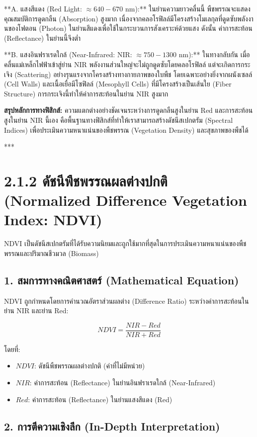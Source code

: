 \documentclass[11pt,a4paper,openany]{report}
\begin{document}
**A. แสงสีแดง (Red Light: $\approx 640 - 670 \text{ nm}$):**
ในย่านความยาวคลื่นนี้ พืชพรรณจะแสดงคุณสมบัติการดูดกลืน (Absorption) สูงมาก เนื่องจากคลอโรฟิลล์มีโครงสร้างโมเลกุลที่ดูดซับพลังงานของโฟตอน (Photon) ในย่านสีแดงเพื่อใช้ในกระบวนการสังเคราะห์ด้วยแสง ดังนั้น ค่าการสะท้อน (Reflectance) ในย่านนี้จึงต่ำ

**B. แสงอินฟราเรดใกล้ (Near-Infrared: NIR: $\approx 750 - 1300 \text{ nm}$):**
ในทางกลับกัน เมื่อคลื่นแม่เหล็กไฟฟ้าเข้าสู่ย่าน NIR พลังงานส่วนใหญ่จะไม่ถูกดูดซับโดยคลอโรฟิลล์ แต่จะเกิดการกระเจิง (Scattering) อย่างรุนแรงจากโครงสร้างทางกายภาพของใบพืช โดยเฉพาะอย่างยิ่งจากผนังเซลล์ (Cell Walls) และเนื้อเยื่อมีโซฟิลล์ (Mesophyll Cells) ที่มีโครงสร้างเป็นเส้นใย (Fiber Structure) การกระเจิงนี้ทำให้ค่าการสะท้อนในย่าน NIR สูงมาก

\textbf{สรุปหลักการทางฟิสิกส์:}
ความแตกต่างอย่างชัดเจนระหว่างการดูดกลืนสูงในย่าน Red และการสะท้อนสูงในย่าน NIR นี้เอง คือพื้นฐานทางฟิสิกส์ที่ทำให้เราสามารถสร้างดัชนีสเปกตรัม (Spectral Indices) เพื่อประเมินความหนาแน่นของพืชพรรณ (Vegetation Density) และสุขภาพของพืชได้

***

\section{2.1.2 ดัชนีพืชพรรณผลต่างปกติ (Normalized Difference Vegetation Index: NDVI)}


NDVI เป็นดัชนีสเปกตรัมที่ได้รับความนิยมและถูกใช้มากที่สุดในการประเมินความหนาแน่นของพืชพรรณและปริมาณชีวมวล (Biomass)

\subsection{1. สมการทางคณิตศาสตร์ (Mathematical Equation)}


NDVI ถูกกำหนดโดยการคำนวณอัตราส่วนผลต่าง (Difference Ratio) ระหว่างค่าการสะท้อนในย่าน NIR และย่าน Red:

$$NDVI = \frac{NIR - Red}{NIR + Red}$$


โดยที่:
\begin{itemize}
  \item $NDVI$: ดัชนีพืชพรรณผลต่างปกติ (ค่าที่ไม่มีหน่วย)
  \item $NIR$: ค่าการสะท้อน (Reflectance) ในย่านอินฟราเรดใกล้ (Near-Infrared)
  \item $Red$: ค่าการสะท้อน (Reflectance) ในย่านแสงสีแดง (Red)
\end{itemize}


\subsection{2. การตีความเชิงลึก (In-Depth Interpretation)}
\end{document}
